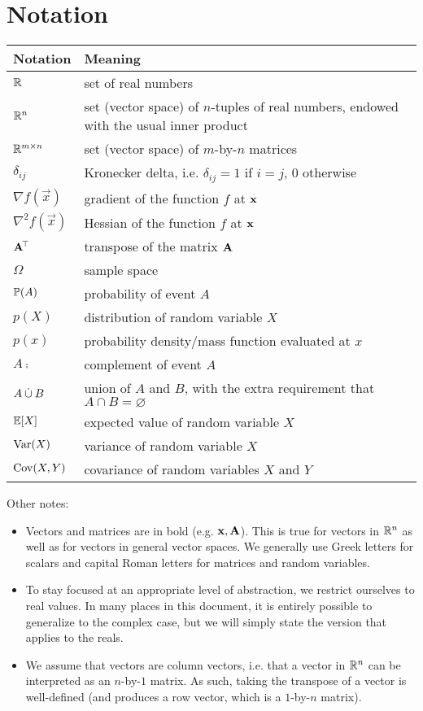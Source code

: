 \documentclass{article}
\begin{document}
\section{Notation}
\begin{tabular}{|l|l|}
\hline
Notation & Meaning \\
\hline
$\mathbb{R}$ & set of real numbers \\
$\mathbb{R}^n$ & set (vector space) of $n$-tuples of real numbers, endowed with the usual inner product \\
$\mathbb{R}^{m \times n}$ & set (vector space) of $m$-by-$n$ matrices \\
$\delta_{ij}$ & Kronecker delta, i.e. $\delta_{ij} = 1$ if $i = j$, $0$ otherwise \\
$\nabla f(\vec{x})$ & gradient of the function $f$ at $\mathbf{x}$ \\
$\nabla^2 f(\vec{x})$ & Hessian of the function $f$ at $\mathbf{x}$ \\
$\mathbf{A}^{\!\top\!}$ & transpose of the matrix $\mathbf{A}$ \\
$\Omega$ & sample space \\
$\mathbb{P}(A)$ & probability of event $A$ \\
$p(X)$ & distribution of random variable $X$ \\
$p(x)$ & probability density/mass function evaluated at $x$ \\
$A\comp$ & complement of event $A$ \\
$A \mathbin{\dot{\cup}} B$ & union of $A$ and $B$, with the extra requirement that $A \cap B = \varnothing$ \\
$\mathbb{E}[X]$ & expected value of random variable $X$ \\
$\operatorname{Var}(X)$ & variance of random variable $X$ \\
$\operatorname{Cov}(X, Y)$ & covariance of random variables $X$ and $Y$ \\
\hline
\end{tabular}

\vspace{0.5cm}
Other notes:
\begin{itemize}
\item Vectors and matrices are in bold (e.g. $\mathbf{x}, \mathbf{A}$).
This is true for vectors in $\mathbb{R}^n$ as well as for vectors in general vector spaces.
We generally use Greek letters for scalars and capital Roman letters for matrices and random variables.

\item To stay focused at an appropriate level of abstraction, we restrict ourselves to real values.
In many places in this document, it is entirely possible to generalize to the complex case, but we will simply state the version that applies to the reals.

\item We assume that vectors are column vectors, i.e. that a vector in $\mathbb{R}^n$ can be interpreted as an $n$-by-$1$ matrix.
As such, taking the transpose of a vector is well-defined (and produces a row vector, which is a $1$-by-$n$ matrix).
\end{itemize}
\end{document}
